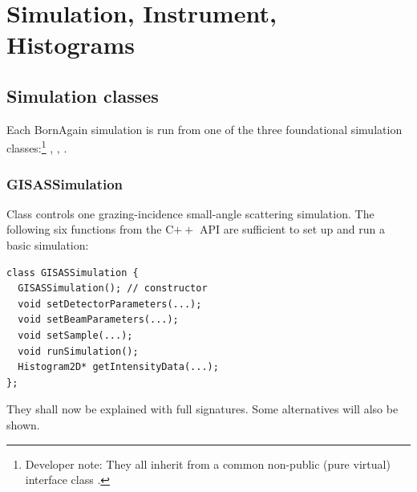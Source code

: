 

\chapter{Simulation, Instrument, Histograms}\label{SRefBas}

\section{Simulation classes}\label{SRefSim}

Each BornAgain simulation is run from one of the three
foundational simulation classes:\footnote
{Developer note: They all inherit from a common non-public (pure virtual)
interface class .}
,
,
.

\subsection{GISAS\-Simulation}

Class  controls one
grazing-incidence small-angle scattering simulation.
The following six functions from the C$++$ API are sufficient to set up and run a basic
simulation:
\setCpp
\begin{lstlisting}
class GISASSimulation {
  GISASSimulation(); // constructor
  void setDetectorParameters(...);
  void setBeamParameters(...);
  void setSample(...);
  void runSimulation();
  Histogram2D* getIntensityData(...);
};
\end{lstlisting}
%
They shall now be explained with full signatures.
Some alternatives will also be shown.

